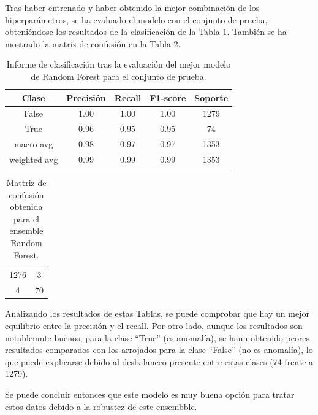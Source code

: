 \documentclass[12pt,letterpaper]{article}
\begin{document}
Tras haber entrenado y haber obtenido la mejor combinación de los hiperparámetros, se ha evaluado el modelo con el conjunto de prueba, obteniéndose los resultados de la clasificación de la Tabla \ref{tab:res-RF}. También se ha mostrado la matriz de confusión en la Tabla \ref{tab:confusion-RF}.
\begin{table}[H]
    \centering
    \begin{tabular}{ccccc}
    \hline
    \textbf{Clase} & \textbf{Precisión} & \textbf{Recall} & \textbf{F1-score} & \textbf{Soporte} \\ \hline
    False & 1.00 & 1.00 & 1.00 & 1279 \\ 
    True & 0.96 & 0.95 & 0.95 & 74 \\ 
    macro avg & 0.98 & 0.97 & 0.97 & 1353 \\ 
    weighted avg & 0.99 & 0.99 & 0.99 & 1353 \\ \hline
    \end{tabular}
    \caption{Informe de clasificación tras la evaluación del mejor modelo de Random Forest para el conjunto de prueba.}
    \label{tab:res-RF}
\end{table}

\begin{table}[H]
    \centering
    \begin{tabular}{|cc|}
    \hline
    1276 & 3 \\
    4 & 70 \\ \hline
    \end{tabular}
    \caption{Mattriz de confusión obtenida para el ensemble Random Forest.}
    \label{tab:confusion-RF}
\end{table}

Analizando los resultados de estas Tablas, se puede comprobar que hay un mejor equilibrio entre la precisión y el recall. Por otro lado, aunque los resultados son notablemnte buenos, para la clase ``True'' (es anomalía), se hann obtenido peores resultados comparados con los arrojados para la clase ``False'' (no es anomalía), lo que puede explicarse debido al desbalanceo presente entre estas clases (74 frente a 1279).

Se puede concluir entonces que este modelo es muy buena opción para tratar estos datos debido a la robustez de este ensembble.
\end{document}
